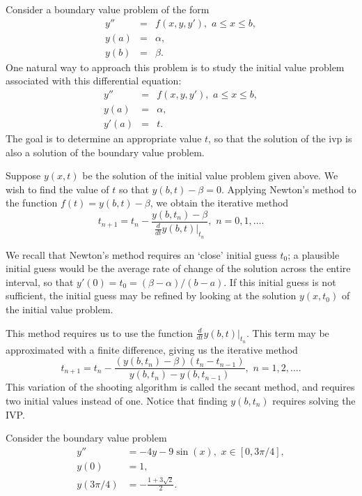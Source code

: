 \label{lab:Shooting}

Consider a boundary value problem of the form 
\begin{eqnarray*}
y'' &=& f(x,y,y'), \,\, a \leq x \leq b, \\
y(a) &=& \alpha, \\
y(b) &=& \beta. 
\end{eqnarray*}
One natural way to approach this problem is to study the initial value problem associated with this differential equation: 
\begin{eqnarray*}
y'' &=& f(x,y,y'), \,\, a \leq x \leq b, \\
y(a) &=& \alpha, \\
y'(a) &=& t. 
\end{eqnarray*}
The goal is to determine an  appropriate value $t$, so that the solution of the ivp is also a solution of the boundary value problem. 

Suppose $y(x,t)$ be the solution of the initial value problem given above. We wish to find the value of $t$ so that 
$y(b,t) - \beta = 0$. 
Applying Newton's method to the function $f(t) = y(b,t) - \beta$, we obtain the iterative method 
\[t_{n+1} = t_n - \frac{ y(b,t_n) - \beta}{\frac{d}{dt} \left.y(b,t)\right|_{t_n} }, \,\, n = 0,1,\hdots .\]

We recall that Newton's method requires an `close' initial guess $t_0$; a plausible initial guess would be the average rate of change of the solution across the entire interval, so that $y'(0) = t_0 =  (\beta - \alpha)/(b-a)$. If this initial guess is not sufficient, the initial guess may be refined by looking at the solution $y(x,t_0)$ of the initial value problem.

This method requires us to use the function $\frac{d}{dt} \left.y(b,t)\right|_{t_n}$. This term may be approximated with a finite difference, giving us the iterative method
\[t_{n+1} = t_n - \frac{ (y(b,t_n) - \beta)(t_n - t_{n-1})}{y(b,t_n) - y(b,t_{n-1}) }, \,\, n = 1, 2,\hdots .\]
This variation of the shooting algorithm is called the secant method, and requires two initial values instead of one. Notice that finding $y(b,t_n)$ requires solving the IVP.

Consider the boundary value problem
\begin{equation}
\begin{split}
\label{bvp1}
y'' &= -4y -9\sin(x), \,\, x \in [0,3\pi/4],\\
y(0) &= 1, \\
y(3 \pi/4) &= -\frac{1+3\sqrt{2}}{2}.
\end{split}
\end{equation}


